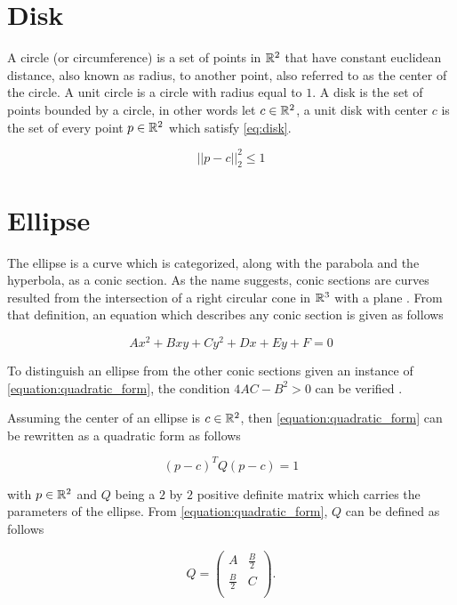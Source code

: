 \section{Disk}

A circle (or circumference) is a set of points in $\mathbb{R}^2$ that have constant euclidean distance, also known as radius, to another point, also referred to as the center of the circle. A unit circle is a circle with radius equal to $1$.
A disk is the set of points bounded by a circle, in other words let $c \in \mathbb{R}^2$, a unit disk with center $c$ is the set of every point $p \in \mathbb{R}^2$ which satisfy \autoref{eq:disk}.

\begin{equation}\label{eq:disk}
||p-c||_2^2 \le 1
\end{equation} 

\section{Ellipse}

The ellipse is a curve which is categorized, along with the parabola and the hyperbola, as a conic section. As the name suggests, conic sections are curves resulted from the intersection of a right circular cone in $\mathbb{R}^3$ with a plane \cite{brannan:geometry}. From that definition, an equation which describes any conic section is given as follows

\begin{equation}\label{equation:quadratic_form}
Ax^2 + Bxy + Cy^2 + Dx + Ey + F = 0
\end{equation}

To distinguish an ellipse from the other conic sections given an instance of \autoref{equation:quadratic_form}, the condition $4AC - B^2>0$ can be verified \cite{ayoub}.

Assuming the center of an ellipse is $c \in \mathbb{R}^2$, then \autoref{equation:quadratic_form} can be rewritten as a quadratic form as follows

\begin{equation}
(p-c)^{T}Q(p-c) = 1
\end{equation}

with $p \in \mathbb{R}^2$ and $Q$ being a $2$ by $2$ positive definite matrix which carries the parameters of the ellipse. From \autoref{equation:quadratic_form}, $Q$ can be defined as follows

\[
Q=
\left( {\begin{array}{cc}
	A & \frac{B}{2} \\
	\frac{B}{2} & C \\
	\end{array} } \right).
\]

